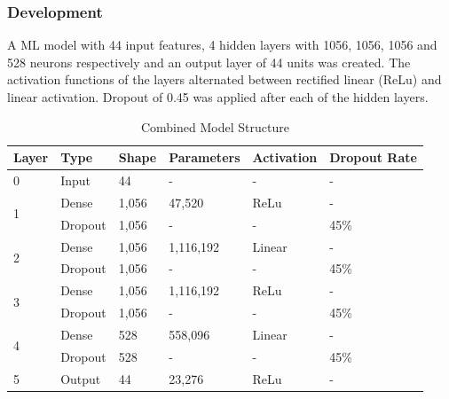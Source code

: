 \subsubsection{Development}


A ML model with 44 input features, 4 hidden layers with 1056, 1056, 1056 and 528 neurons respectively and an output layer of 44 units was created. The activation functions of the layers alternated between rectified linear (ReLu) and linear activation.  Dropout of 0.45 was applied after each of the hidden layers.


\begin{table}[!h]
    \centering
    \caption{Combined Model Structure}
    \begin{tabular}{l l l l l l }
        \textbf{Layer} & \textbf{Type} & \textbf{Shape} & \textbf{Parameters} & \textbf{Activation} & \textbf{Dropout Rate} \\
        \hline
        0 & Input & 44 & - & - & - \\
        \hline
        \multirow[t]{2}{*}{1} & Dense & 1,056 & 47,520 & ReLu  & - \\ \cline{2-6}
        
        & Dropout & 1,056 & - & - & 45\% \\
        \hline
        \multirow[t]{2}{*}{2} & Dense & 1,056 & 1,116,192 & Linear  & - \\  \cline{2-6}
        
        & Dropout & 1,056 & - & - & 45\% \\
        \hline
        \multirow[t]{2}{*}{3} &  Dense & 1,056 & 1,116,192 & ReLu  & - \\ \cline{2-6}
        
        & Dropout & 1,056 & - & - & 45\% \\
        \hline
        \multirow[t]{2}{*}{4} & Dense & 528 & 558,096 & Linear  & - \\ \cline{2-6}
        
        & Dropout & 528 & - & - & 45\% \\
        \hline
        5 &Output & 44 & 23,276 & ReLu & - \\
        \hline
    \end{tabular}
    \label{tab:combined_model_struct}
\end{table}

